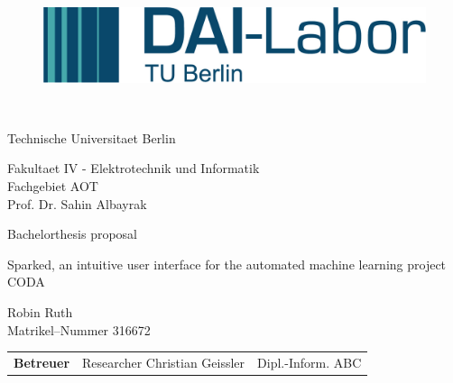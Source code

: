 \thispagestyle{empty}
\begin{figure}[htbp]
	\centering
 \begin{minipage}[b]{41 mm}
   \includegraphics[width=40 mm]{figures/DAI_Logo.png}
 \end{minipage}
\end{figure}

~\vspace{0.5cm}

\begin{center}
\begin{Huge}
Technische Universitaet Berlin\\
\vspace{1mm}
\end{Huge}{\Large Fakultaet IV - Elektrotechnik und Informatik\\
Fachgebiet AOT\\
Prof. Dr. Sahin Albayrak}\\

\vspace{26mm}
\begin{LARGE}
Bachelorthesis proposal\\
\end{LARGE}
\vspace{8mm}
\begin{LARGE}
Sparked, an intuitive user interface for the automated machine learning project CODA\\
\end{LARGE}
\vspace{3 cm}
Robin Ruth\\
Matrikel--Nummer 316672\\
\vspace{1cm}
\begin{tabular}{lll}
{\bf Betreuer} & Researcher Christian Geissler & Dipl.-Inform. ABC\\
\end{tabular}

\end{center}

